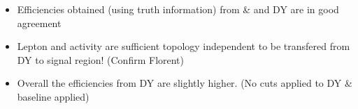 \documentclass{beamer}
\begin{document}
\begin{frame}
\begin{columns}
\begin{column}{0.33\textwidth}
   \end{column}
  \end{columns}
\begin{itemize}
 \item Efficiencies obtained (using truth information) from \ttbar \& \wpj and DY are in good agreement
 \item Lepton \pt and activity are sufficient topology independent to be transfered from DY to signal region! (Confirm Florent)
 \item Overall the efficiencies from DY are slightly higher. (No cuts applied to DY \ttbar \& \wpj baseline applied)
\end{itemize}
\end{frame}
\end{document}
